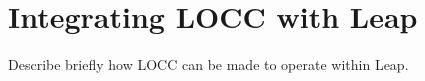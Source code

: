 
\appendix

\chapter{Integrating LOCC with Leap}

Describe briefly how LOCC can be made to operate within Leap.
